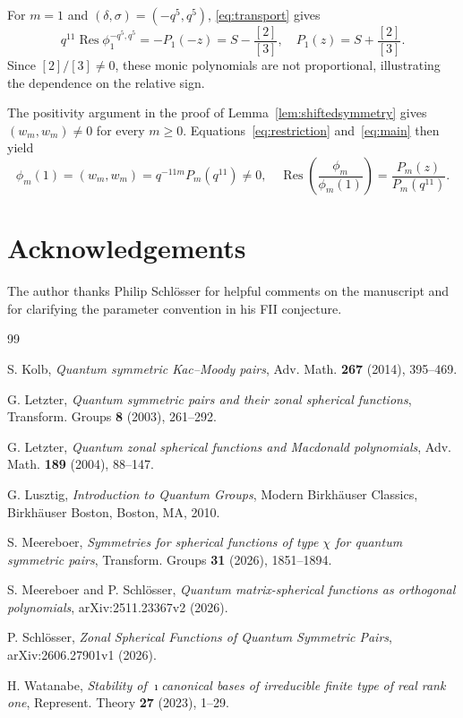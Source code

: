 \documentclass[12pt,reqno]{amsart}
\theoremstyle{plain}
\theoremstyle{definition}
\numberwithin{equation}{section}
\newcommand{\Res}{\operatorname{Res}}
\begin{document}
For $m=1$ and $(\delta,\sigma)=(-q^5,q^5)$,
\eqref{eq:transport} gives
\[
 q^{11}\Res\phi_1^{-q^5,q^5}
 =-P_1(-z)=S-\frac{[2]}{[3]},
 \quad P_1(z)=S+\frac{[2]}{[3]}.
\]
Since $[2]/[3]\ne0$, these monic polynomials are not proportional,
illustrating the dependence on the relative sign.

The positivity argument in the proof of
Lemma~\ref{lem:shiftedsymmetry} gives $(w_m,w_m)\ne0$
for every $m\ge0$.
Equations~\eqref{eq:restriction} and~\eqref{eq:main} then yield
\[
\phi_m(1)
=(w_m,w_m)=q^{-11m}P_m(q^{11})\ne0,\quad
\Res\!\left(\frac{\phi_m}{\phi_m(1)}\right)
=\frac{P_m(z)}{P_m(q^{11})}.
\]
\section*{Acknowledgements}
The author thanks Philip Schl\"osser for helpful comments on the manuscript
and for clarifying the parameter convention in his FII conjecture.

\begin{thebibliography}{99}
\raggedright
{} S. Kolb,
\emph{Quantum symmetric Kac--Moody pairs},
Adv. Math. \textbf{267} (2014), 395--469.

 G. Letzter,
\emph{Quantum symmetric pairs and their zonal spherical functions},
Transform. Groups \textbf{8} (2003), 261--292.

 G. Letzter,
\emph{Quantum zonal spherical functions and Macdonald polynomials},
Adv. Math. \textbf{189} (2004), 88--147.

 G. Lusztig,
\emph{Introduction to Quantum Groups},
Modern Birkh\"auser Classics,
Birkh\"auser Boston, Boston, MA, 2010.

 S. Meereboer,
\emph{Symmetries for spherical functions of type $\chi$ for quantum
symmetric pairs}, Transform. Groups \textbf{31} (2026), 1851--1894.

 S. Meereboer and P. Schl\"osser,
\emph{Quantum matrix-spherical functions as orthogonal polynomials},
arXiv:2511.23367v2 (2026).

 P. Schl\"osser,
\emph{Zonal Spherical Functions of Quantum Symmetric Pairs},
arXiv:2606.27901v1 (2026).

 H. Watanabe,
\emph{Stability of $\imath$canonical bases of irreducible finite type of
real rank one}, Represent. Theory \textbf{27} (2023), 1--29.

\end{thebibliography}
\end{document}
